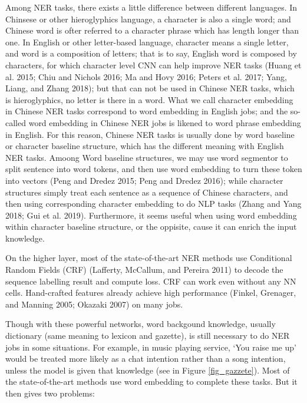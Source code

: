 \documentclass[letterpaper]{article} %
\begin{document}
Among NER tasks, there exists a little difference between different languages. In Chinsese or other hieroglyphics language, a character is also a single word; and Chinese word is ofter referred to a character phrase which has length longer than one. In English or other letter-based language, character means a single letter, and word is a composition of letters; that is to say, English word is composed by characters, for which character level CNN can help improve NER tasks (Huang et al. 2015; Chiu and Nichols 2016; Ma and Hovy 2016; Peters et al. 2017; Yang, Liang, and Zhang 2018); but that can not be used in Chinese NER tasks, which is hieroglyphics, no letter is there in a word. What we call character embedding in Chinese NER tasks correspond to word embedding in English jobs; and the so-called word embedding in Chinese NER jobs is likened to word phrase embedding in English. For this reason, Chinese NER tasks is usually done by word baseline or character baseline structure, which has the different meaning with English NER tasks. Amoong Word baseline structures, we may use word segmentor to split sentence into word tokens, and then use word embedding to turn these token into vectors (Peng and Dredez 2015; Peng and Dredez 2016); while character structures simply treat each sentence as a sequence of Chinese characters, and then using corresponding character embedding to do NLP tasks (Zhang and Yang 2018; Gui et al. 2019). Furthermore, it seems useful when using word embedding within character baseline structure, or the oppisite, cause it can enrich the input knowledge.

On the higher layer, most of the state-of-the-art NER methods use Conditional Random Fields (CRF) (Lafferty, McCallum, and Pereira 2011) to decode the sequence labelling result and compute loss. CRF can work even without any NN cells. Hand-crafted features already achieve high performance (Finkel, Grenager, and Manning 2005; Okazaki 2007) on many jobs. 

Though with these powerful networks, word backgound knowledge, usually dictionary (same meaning to lexicon and gazette), is still necessary to do NER jobs in some situations. For example, in music playing service, `You raise me up' would be treated more likely as a chat intention rather than a song intention, unless the model is given that knowledge (see in Figure \ref{fig_gazzete}). Most of the state-of-the-art methods use word embedding to complete these tasks. But it then gives two problems: 
\end{document}
